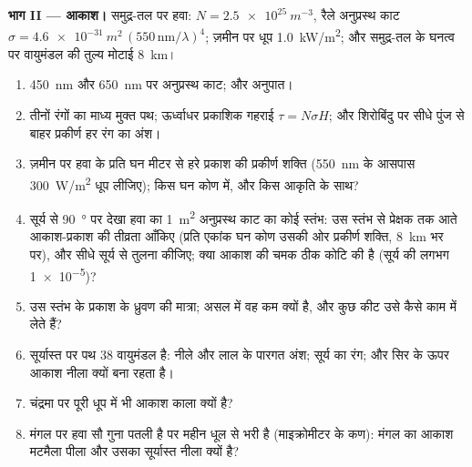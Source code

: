 \begin{problem}[{सप्ताहांत समस्या --- तीन ऐंटेना: कोई प्रसारण
मीनार, धूप में हवा का कोई अणु, और कोई मुक्त इलेक्ट्रॉन}]
\medskip
\noindent\textbf{भाग II --- आकाश।}
समुद्र-तल पर हवा: $N = \qty{2.5e25}{m^{-3}}$, रैले अनुप्रस्थ काट $\sigma =
\qty{4.6e-31}{m^2}\,(550\,\text{nm}/\lambda)^4$; ज़मीन पर धूप \qty{1.0}{kW/m^2};
और समुद्र-तल के घनत्व पर वायुमंडल की तुल्य मोटाई
\qty{8}{km}।
\begin{enumerate}[resume]
  \item \qty{450}{nm} और \qty{650}{nm} पर अनुप्रस्थ काट; और अनुपात।
  \item तीनों रंगों का माध्य मुक्त पथ; ऊर्ध्वाधर प्रकाशिक गहराई
        $\tau = N\sigma H$; और शिरोबिंदु पर सीधे पुंज से बाहर प्रकीर्ण हर रंग
        का अंश।
  \item ज़मीन पर हवा के प्रति घन मीटर से हरे प्रकाश की प्रकीर्ण
        शक्ति (\qty{550}{nm} के आसपास \qty{300}{W/m^2} धूप लीजिए);
        किस घन कोण में, और किस आकृति के साथ?
  \item सूर्य से \qty{90}{\degree} पर देखा हवा का \qty{1}{m^2} अनुप्रस्थ काट का कोई स्तंभ:
        उस स्तंभ से प्रेक्षक तक आते आकाश-प्रकाश की तीव्रता आँकिए
        (प्रति एकांक घन कोण उसकी ओर प्रकीर्ण शक्ति, \qty{8}{km} भर पर),
        और सीधे सूर्य से तुलना कीजिए; क्या आकाश की चमक ठीक कोटि की
        है (सूर्य की लगभग \qty{1e-5}{})?
  \item उस स्तंभ के प्रकाश के ध्रुवण की मात्रा; असल में वह कम क्यों
        है, और कुछ कीट उसे कैसे काम में लेते हैं?
  \item सूर्यास्त पर पथ $38$ वायुमंडल है: नीले और लाल के पारगत
        अंश; सूर्य का रंग; और सिर के ऊपर आकाश नीला क्यों बना
        रहता है।
  \item चंद्रमा पर पूरी धूप में भी आकाश काला क्यों है?
  \item मंगल पर हवा सौ गुना पतली है पर महीन धूल से भरी है
        (माइक्रोमीटर के कण): मंगल का आकाश मटमैला पीला और उसका
        सूर्यास्त नीला क्यों है?
\end{enumerate}


\end{problem}
